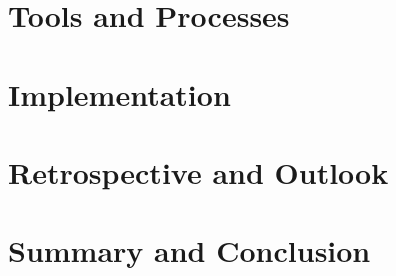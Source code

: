 \documentclass{clbthesis}
\begin{document}
\chapter{Tools and Processes}					


\chapter{Implementation}						


\chapter{Retrospective and Outlook} 			


\chapter{Summary and Conclusion}				




\cleardoublepage
{}
{}\listoffigures

\listoftables


\appendix



% 
\end{document}
